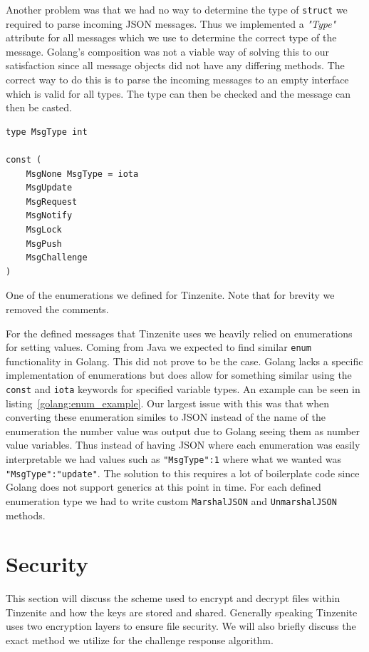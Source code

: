 Another problem was that we had no way to determine the type of \texttt{struct} we required to parse incoming JSON messages.
Thus we implemented a \textit{"Type"} attribute for all messages which we use to determine the correct type of the message.
Golang's composition was not a viable way of solving this to our satisfaction since all message objects did not have any differing methods.
The correct way to do this is to parse the incoming messages to an empty interface which is valid for all types.
The type can then be checked and the message can then be casted.

\begin{listing}[htp]
    \begin{lstlisting}[language=golang,firstnumber=0]
type MsgType int

const (
	MsgNone MsgType = iota
	MsgUpdate
	MsgRequest
	MsgNotify
	MsgLock
	MsgPush
	MsgChallenge
)
    \end{lstlisting}
\caption[Golang Enum Example]{One of the enumerations we defined for Tinzenite. Note that for brevity we removed the comments.}
\label{golang:enum_example}
\end{listing}

For the defined messages that Tinzenite uses we heavily relied on enumerations for setting values.
Coming from Java we expected to find similar \texttt{enum} functionality in Golang.
This did not prove to be the case.
Golang lacks a specific implementation of enumerations but does allow for something similar using the \texttt{const} and \texttt{iota} keywords for specified variable types.
An example can be seen in listing~\ref{golang:enum_example}.
Our largest issue with this was that when converting these enumeration similes to JSON instead of the name of the enumeration the number value was output due to Golang seeing them as number value variables.
Thus instead of having JSON where each enumeration was easily interpretable we had values such as \texttt{"MsgType":1} where what we wanted was \texttt{"MsgType":"update"}.
The solution to this requires a lot of boilerplate code since Golang does not support generics at this point in time.
For each defined enumeration type we had to write custom \texttt{MarshalJSON} and \texttt{UnmarshalJSON} methods.

\section{Security}
\label{sec:Security}

This section will discuss the scheme used to encrypt and decrypt files within Tinzenite and how the keys are stored and shared.
Generally speaking Tinzenite uses two encryption layers to ensure file security.
We will also briefly discuss the exact method we utilize for the challenge response algorithm.

